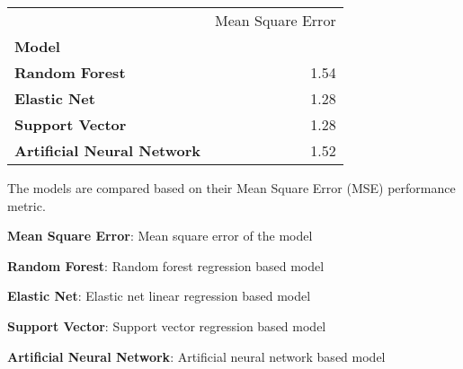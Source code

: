 \documentclass[11pt]{article}
\author{Data to Paper}
\begin{document}
\newsavebox{\mytablebox} %

\begin{lrbox}{\mytablebox}
 \begin{tabular}{lr}
\toprule
{} &  Mean Square Error \\
\textbf{Model                    } &                    \\
\midrule
\textbf{Random Forest            } &               1.54 \\
\textbf{Elastic Net              } &               1.28 \\
\textbf{Support Vector           } &               1.28 \\
\textbf{Artificial Neural Network} &               1.52 \\
\bottomrule
\end{tabular}%
\end{lrbox}

\begin{table}[h]
\caption{Comparison of machine learning models for predicting optimal tracheal tube depth}
\label{table:model_comparisons}
\begin{threeparttable}
\renewcommand{\TPTminimum}{\linewidth}
\begin{tablenotes}
\footnotesize
\item The models are compared based on their Mean Square Error (MSE) performance metric.
\item \textbf{Mean Square Error}: Mean square error of the model
\item \textbf{Random Forest}: Random forest regression based model
\item \textbf{Elastic Net}: Elastic net linear regression based model
\item \textbf{Support Vector}: Support vector regression based model
\item \textbf{Artificial Neural Network}: Artificial neural network based model
\end{tablenotes}
\end{threeparttable}
\end{table}


\end{document}
